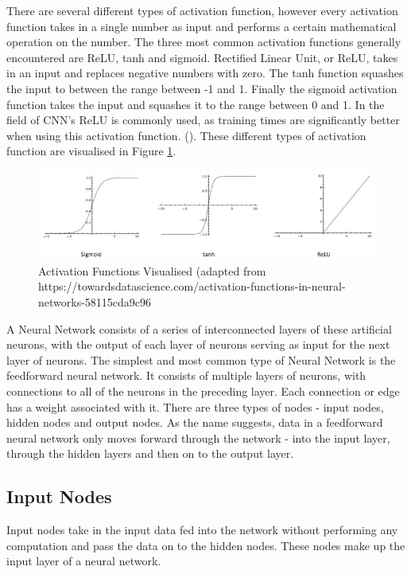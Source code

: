 \documentclass[12pt]{report}
\begin{document}
\begin{flushleft}
There are several different types of activation function, however every activation function takes in a single number as input and performs a certain mathematical operation on the number. The three most common activation functions generally encountered are ReLU, tanh and sigmoid. Rectified Linear Unit, or ReLU, takes in an input and replaces negative numbers with zero. The tanh function squashes the input to between the range between -1 and 1. Finally the sigmoid activation function takes the input and squashes it to the range between 0 and 1. In the field of CNN's ReLU is commonly used, as training times are significantly better when using this activation function. (\cite{krizhevsky2012imagenet}). These different types of activation function are visualised in Figure \ref{fig:functions}.
\end{flushleft}

\vspace{0.5cm}
\begin{figure}[ht!]
	\centering
	\includegraphics[width=12cm]{functions}
	\caption{Activation Functions Visualised (adapted from https://towardsdatascience.com/activation-functions-in-neural-networks-58115cda9c96}
	\label{fig:functions}
\end{figure}

\begin{flushleft}
A Neural Network consists of a series of interconnected layers of these artificial neurons, with the output of each layer of neurons serving as input for the next layer of neurons. The simplest and most common type of Neural Network is the feedforward neural network. It consists of multiple layers of neurons, with connections to all of the neurons in the preceding layer. Each connection or edge has a weight associated with it. There are three types of nodes - input nodes, hidden nodes and output nodes. As the name suggests, data in a feedforward neural network only moves forward through the network - into the input layer, through the hidden layers and then on to the output layer.
\end{flushleft}

\subsection{Input Nodes}
\begin{flushleft}
Input nodes take in the input data fed into the network without performing any computation and pass the data on to the hidden nodes. These nodes make up the input layer of a neural network.
\end{flushleft}
\end{document}
